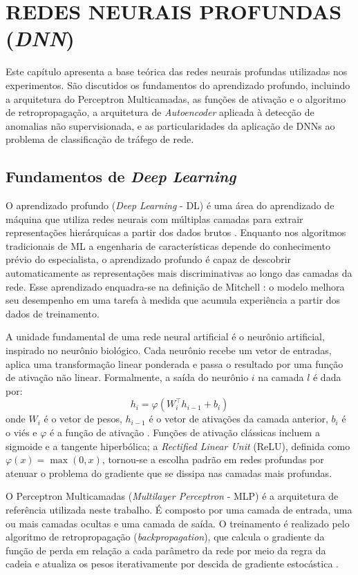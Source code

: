 \chapter{REDES NEURAIS PROFUNDAS (\textit{DNN})}

Este capítulo apresenta a base teórica das redes neurais profundas utilizadas nos experimentos. São discutidos os fundamentos do aprendizado profundo, incluindo a arquitetura do Perceptron Multicamadas, as funções de ativação e o algoritmo de retropropagação, a arquitetura de \textit{Autoencoder} aplicada à detecção de anomalias não supervisionada, e as particularidades da aplicação de DNNs ao problema de classificação de tráfego de rede.

\section{Fundamentos de \textit{Deep Learning}}

O aprendizado profundo (\textit{Deep Learning} - DL) é uma área do aprendizado de máquina que utiliza redes neurais com múltiplas camadas para extrair representações hierárquicas a partir dos dados brutos \cite{bochie2020sbrc}. Enquanto nos algoritmos tradicionais de ML a engenharia de características depende do conhecimento prévio do especialista, o aprendizado profundo é capaz de descobrir automaticamente as representações mais discriminativas ao longo das camadas da rede. Esse aprendizado enquadra-se na definição de Mitchell \cite{mitchell1997}: o modelo melhora seu desempenho em uma tarefa à medida que acumula experiência a partir dos dados de treinamento.

A unidade fundamental de uma rede neural artificial é o neurônio artificial, inspirado no neurônio biológico. Cada neurônio recebe um vetor de entradas, aplica uma transformação linear ponderada e passa o resultado por uma função de ativação não linear. Formalmente, a saída do neurônio $i$ na camada $l$ é dada por:
\[
  h_i = \varphi\!\left(W_i^\top h_{i-1} + b_i\right)
\]
onde $W_i$ é o vetor de pesos, $h_{i-1}$ é o vetor de ativações da camada anterior, $b_i$ é o viés e $\varphi$ é a função de ativação \cite{bochie2020sbrc}. Funções de ativação clássicas incluem a sigmoide e a tangente hiperbólica; a \textit{Rectified Linear Unit} (ReLU), definida como $\varphi(x) = \max(0, x)$, tornou-se a escolha padrão em redes profundas por atenuar o problema do gradiente que se dissipa nas camadas mais profundas.

O Perceptron Multicamadas (\textit{Multilayer Perceptron} - MLP) é a arquitetura de referência utilizada neste trabalho. É composto por uma camada de entrada, uma ou mais camadas ocultas e uma camada de saída. O treinamento é realizado pelo algoritmo de retropropagação (\textit{backpropagation}), que calcula o gradiente da função de perda em relação a cada parâmetro da rede por meio da regra da cadeia e atualiza os pesos iterativamente por descida de gradiente estocástica \cite{bochie2020sbrc}.

